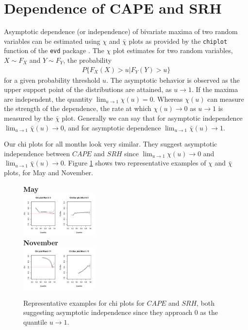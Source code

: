 \documentclass[10pt,conference,compsocconf]{IEEEtran}
\begin{document}
\section*{Dependence of CAPE and SRH}
Asymptotic dependence (or independence) of bivariate maxima of two random variables can be estimated using $\chi$ and $\bar{\chi}$ plots as provided by the \texttt{chiplot} function of the \texttt{evd} package \cite{evd}. The $\chi$ plot estimates for two random variables, $X \sim F_X$ and $Y \sim F_Y$, the probability 
\begin{align*}
	P\{F_X (X) > u | F_Y (Y) > u\}
\end{align*}
for a given probability threshold $u$. The asymptotic behavior is observed as the upper support point of the distributions are attained, as $u \to 1$. If the maxima are independent, the quantity $\lim_{u \to 1} \chi(u) = 0$. Whereas $\chi(u)$ can measure the strength of the dependence, the rate at which $\chi(u) \to 0$ as $u \to 1$ is measured by the $\bar{\chi}$ plot. Generally we can say that for asymptotic independence $\lim_{u \to 1} \bar{\chi}(u) \to 0$, and for asymptotic dependence $\lim_{u \to 1} \bar{\chi}(u) \to 1$. 
\par
Our chi plots for all months look very similar. They suggest asymptotic independence between $CAPE$ and $SRH$ since $\lim_{u \to 1} \chi(u) \to 0$ and $\lim_{u \to 1} \bar{\chi}(u) \to 0$. Figure \ref{fig:cape_srh_chi} shows two representative examples of $\chi$ and $\bar{\chi}$ plots, for May and November. 

\begin{figure}
	\centering
	\textbf{May}\\
	\includegraphics[width=0.35\textwidth]{../plots/May_chi.pdf}\\
	\textbf{November}\\
	\includegraphics[width=0.35\textwidth]{../plots/November_chi.pdf}
	\caption{Representative examples for chi plots for $CAPE$ and $SRH$, both suggesting asymptotic independence since they approach 0 as the quantile $u \to 1$.}
	\label{fig:cape_srh_chi}
\end{figure}
\end{document}
